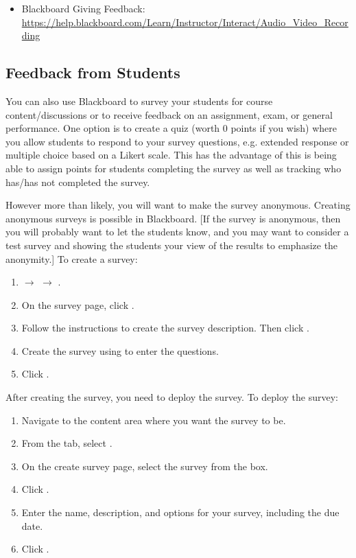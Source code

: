 	\begin{itemize}
	\item Blackboard Giving Feedback: \url{https://help.blackboard.com/Learn/Instructor/Interact/Audio_Video_Recording}
	\end{itemize}




\subsection{Feedback from Students}

You can also use Blackboard to survey your students for course content/discussions or to receive feedback on an assignment, exam, or general performance. One option is to create a  quiz (worth 0 points if you wish) where you allow students to respond to your survey questions, e.g. extended response or multiple choice based on a Likert scale. This has the advantage of this is being able to assign points for students completing the survey as well as tracking who has/has not completed the survey. 

However more than likely, you will want to make the survey anonymous. Creating anonymous surveys is possible in Blackboard. [If the survey is anonymous, then you will probably want to let the students know, and you may want to consider a test survey and showing the students your view of the results to emphasize the anonymity.] To create a survey:

	\begin{enumerate}[1.]
	\item {} $\to$  $\to$ .
	\item On the survey page, click .
	\item Follow the instructions to create the survey description. Then click .
	\item Create the survey using  to enter the questions. 
	\item Click .
	\end{enumerate}

After creating the survey, you need to deploy the survey. To deploy the survey:

	\begin{enumerate}[1.]
	\item Navigate to the content area where you want the survey to be.
	\item From the  tab, select .
	\item On the create survey page, select the survey from the  box.
	\item Click .
	\item Enter the name, description, and options for your survey, including the due date.
	\item Click .
	\end{enumerate}

